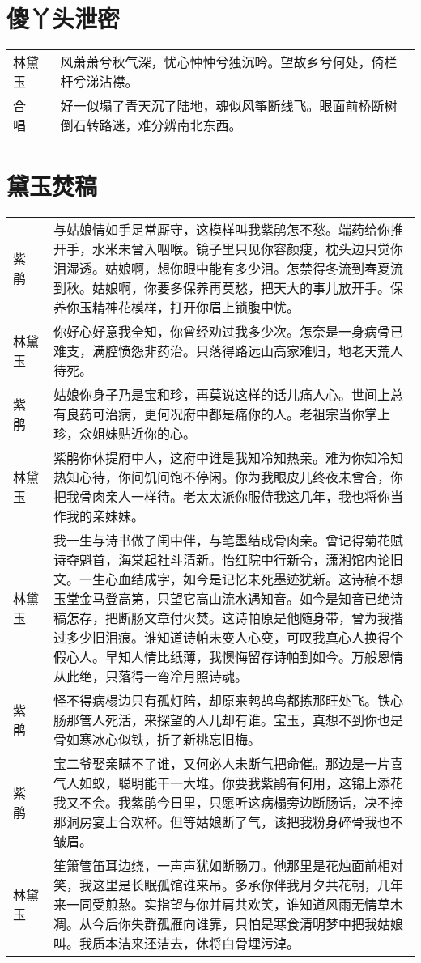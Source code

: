 \documentclass{article}
\newenvironment{lpar}{\vspace{-1ex}\begin{longtable}{lp{0.85\columnwidth}}}{\end{longtable}}
\newcommand\lver[2]{\vspace{1ex}#1&#2\\}
\begin{document}
\section{傻丫头泄密}

\begin{lpar}
\lver{林黛玉}{风萧萧兮秋气深，忧心忡忡兮独沉吟。望故乡兮何处，倚栏杆兮涕沾襟。}
\lver{合　唱}{好一似塌了青天沉了陆地，魂似风筝断线飞。眼面前桥断树倒石转路迷，难分辨南北东西。}
\end{lpar}

\section{黛玉焚稿}

\begin{lpar}
\lver{紫　鹃}{与姑娘情如手足常厮守，这模样叫我紫鹃怎不愁。端药给你推开手，水米未曾入咽喉。镜子里只见你容颜瘦，枕头边只觉你泪湿透。姑娘啊，想你眼中能有多少泪。怎禁得冬流到春夏流到秋。姑娘啊，你要多保养再莫愁，把天大的事儿放开手。保养你玉精神花模样，打开你眉上锁腹中忧。}
\lver{林黛玉}{你好心好意我全知，你曾经劝过我多少次。怎奈是一身病骨已难支，满腔愤怨非药治。只落得路远山高家难归，地老天荒人待死。}
\lver{紫　鹃}{姑娘你身子乃是宝和珍，再莫说这样的话儿痛人心。世间上总有良药可治病，更何况府中都是痛你的人。老祖宗当你掌上珍，众姐妹贴近你的心。}
\lver{林黛玉}{紫鹃你休提府中人，这府中谁是我知冷知热亲。难为你知冷知热知心待，你问饥问饱不停闲。你为我眼皮儿终夜未曾合，你把我骨肉亲人一样待。老太太派你服侍我这几年，我也将你当作我的亲妹妹。}
\lver{林黛玉}{我一生与诗书做了闺中伴，与笔墨结成骨肉亲。曾记得菊花赋诗夺魁首，海棠起社斗清新。怡红院中行新令，潇湘馆内论旧文。一生心血结成字，如今是记忆未死墨迹犹新。这诗稿不想玉堂金马登高第，只望它高山流水遇知音。如今是知音已绝诗稿怎存，把断肠文章付火焚。这诗帕原是他随身带，曾为我揩过多少旧泪痕。谁知道诗帕未变人心变，可叹我真心人换得个假心人。早知人情比纸薄，我懊悔留存诗帕到如今。万般恩情从此绝，只落得一弯冷月照诗魂。}
\lver{紫　鹃}{怪不得病榻边只有孤灯陪，却原来鹁鸪鸟都拣那旺处飞。铁心肠那管人死活，来探望的人儿却有谁。宝玉，真想不到你也是骨如寒冰心似铁，折了新桃忘旧梅。}
\lver{紫　鹃}{宝二爷娶亲瞒不了谁，又何必人未断气把命催。那边是一片喜气人如蚁，聪明能干一大堆。你要我紫鹃有何用，这锦上添花我又不会。我紫鹃今日里，只愿听这病榻旁边断肠话，决不捧那洞房宴上合欢杯。但等姑娘断了气，该把我粉身碎骨我也不皱眉。}
\lver{林黛玉}{笙箫管笛耳边绕，一声声犹如断肠刀。他那里是花烛面前相对笑，我这里是长眠孤馆谁来吊。多承你伴我月夕共花朝，几年来一同受煎熬。实指望与你并肩共欢笑，谁知道风雨无情草木凋。从今后你失群孤雁向谁靠，只怕是寒食清明梦中把我姑娘叫。我质本洁来还洁去，休将白骨埋污淖。}
\end{lpar}
\end{document}
